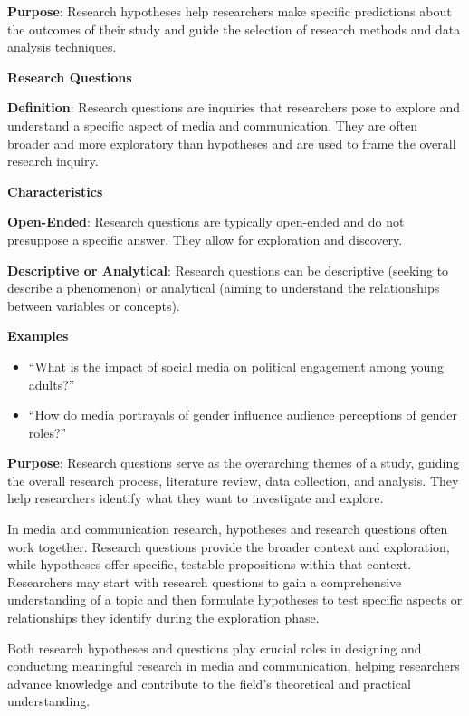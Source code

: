 \documentclass[
  b5paper]{book}
\begin{document}
\textbf{Purpose}: Research hypotheses help researchers make specific predictions about the outcomes of their study and guide the selection of research methods and data analysis techniques.

\textbf{Research Questions}

\textbf{Definition}: Research questions are inquiries that researchers pose to explore and understand a specific aspect of media and communication. They are often broader and more exploratory than hypotheses and are used to frame the overall research inquiry.

\textbf{Characteristics}

\textbf{Open-Ended}: Research questions are typically open-ended and do not presuppose a specific answer. They allow for exploration and discovery.

\textbf{Descriptive or Analytical}: Research questions can be descriptive (seeking to describe a phenomenon) or analytical (aiming to understand the relationships between variables or concepts).

\textbf{Examples}

\begin{itemize}
\item
  ``What is the impact of social media on political engagement among young adults?''
\item
  ``How do media portrayals of gender influence audience perceptions of gender roles?''
\end{itemize}

\textbf{Purpose}: Research questions serve as the overarching themes of a study, guiding the overall research process, literature review, data collection, and analysis. They help researchers identify what they want to investigate and explore.

In media and communication research, hypotheses and research questions often work together. Research questions provide the broader context and exploration, while hypotheses offer specific, testable propositions within that context. Researchers may start with research questions to gain a comprehensive understanding of a topic and then formulate hypotheses to test specific aspects or relationships they identify during the exploration phase.

Both research hypotheses and questions play crucial roles in designing and conducting meaningful research in media and communication, helping researchers advance knowledge and contribute to the field's theoretical and practical understanding.
\end{document}
